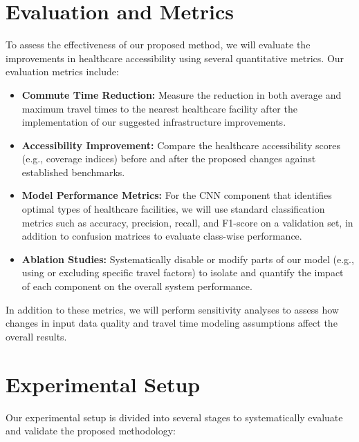 \documentclass[11pt]{article}
\begin{document}
\section{Evaluation and Metrics}
To assess the effectiveness of our proposed method, we will evaluate the improvements in healthcare accessibility using several quantitative metrics. Our evaluation metrics include:
\begin{itemize}
    \item \textbf{Commute Time Reduction:} Measure the reduction in both average and maximum travel times to the nearest healthcare facility after the implementation of our suggested infrastructure improvements.
    \item \textbf{Accessibility Improvement:} Compare the healthcare accessibility scores (e.g., coverage indices) before and after the proposed changes against established benchmarks.
    \item \textbf{Model Performance Metrics:} For the CNN component that identifies optimal types of healthcare facilities, we will use standard classification metrics such as accuracy, precision, recall, and F1-score on a validation set, in addition to confusion matrices to evaluate class-wise performance.
    \item \textbf{Ablation Studies:} Systematically disable or modify parts of our model (e.g., using or excluding specific travel factors) to isolate and quantify the impact of each component on the overall system performance.
\end{itemize}
In addition to these metrics, we will perform sensitivity analyses to assess how changes in input data quality and travel time modeling assumptions affect the overall results.

\section{Experimental Setup}
Our experimental setup is divided into several stages to systematically evaluate and validate the proposed methodology:
\end{document}
